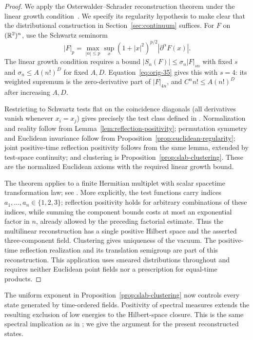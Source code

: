 \begin{proof}
We apply the Osterwalder--Schrader reconstruction theorem under the
linear growth condition~\cite[Section~IV.1]{OS75}.  We specify its regularity
hypothesis to make clear that the distributional construction in
Section~\ref{sec:continuum} suffices.  For $F$ on $(\mathbb R^2)^n$, use the
Schwartz seminorm
\[
 |F|_p=\max_{|\alpha|\le p}\sup_x
       (1+|x|^2)^{p/2}|\partial^\alpha F(x)|.
\]
The linear growth condition requires a bound
$|S_n(F)|\le \sigma_n|F|_{sn}$ with fixed $s$ and
$\sigma_n\le A(n!)^D$ for fixed $A,D$.  Equation~\eqref{eq:orig-35}
gives this with $s=4$: its weighted supremum is the zero-derivative part
of $|F|_{4n}$, and $C^n n!\le A(n!)^D$ after increasing $A,D$.

Restricting to Schwartz tests flat on the coincidence diagonals
(all derivatives vanish whenever $x_i=x_j$) gives precisely the test
class defined in \cite[Section~II, following Equation~(2.1), p.~284]{OS75}.
Normalization and reality follow
from Lemma~\ref{lem:reflection-positivity}; permutation symmetry and
Euclidean invariance follow from
Proposition~\ref{prop:euclidean-regularity}; joint positive-time
reflection positivity follows from the same lemma, extended by
test-space continuity; and clustering is
Proposition~\ref{prop:slab-clustering}.  These are the normalized
Euclidean axioms with the required linear growth bound.

The theorem applies to a finite Hermitian multiplet with
scalar spacetime transformation law; see \cite[Section~I, Remark~5]{OS75}.
More explicitly, the test
functions carry indices $a_1,\ldots,a_n\in\{1,2,3\}$; reflection
positivity holds for arbitrary combinations of these indices, while
summing the component bounds costs at most an exponential factor in
$n$, already allowed by the preceding factorial estimate.  Thus the
multilinear reconstruction has a single positive Hilbert space and the
asserted three-component field.  Clustering gives uniqueness of the
vacuum.  The positive-time reflection realization and its translation
semigroup are part of this reconstruction.  This application uses
smeared distributions throughout and requires neither Euclidean point
fields nor a prescription for equal-time products.
\end{proof}

The uniform exponent in Proposition~\ref{prop:slab-clustering} now
controls every state generated by time-ordered fields.  Positivity of
spectral measures extends the resulting exclusion of low energies to
the Hilbert-space closure.  This is the same spectral implication as
in ; we give the argument for the present
reconstructed states.

